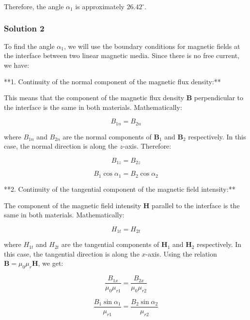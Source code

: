 \documentclass{article}
\begin{document}
Therefore, the angle $\alpha_1$ is approximately $26.42^\circ$.

\subsubsection{Solution 2}
To find the angle $\alpha_1$, we will use the boundary conditions for magnetic fields at the interface between two linear magnetic media. Since there is no free current, we have:

**1. Continuity of the normal component of the magnetic flux density:**

This means that the component of the magnetic flux density $\mathbf{B}$ perpendicular to the interface is the same in both materials. Mathematically:

\begin{equation*}
B_{1n} = B_{2n}
\end{equation*}

where $B_{1n}$ and $B_{2n}$ are the normal components of $\mathbf{B}_1$ and $\mathbf{B}_2$ respectively. In this case, the normal direction is along the $z$-axis. Therefore:

\begin{equation*}
B_{1z} = B_{2z}
\end{equation*}

\begin{equation*}
B_1 \cos \alpha_1 = B_2 \cos \alpha_2
\end{equation*}

**2. Continuity of the tangential component of the magnetic field intensity:**

The component of the magnetic field intensity $\mathbf{H}$ parallel to the interface is the same in both materials. Mathematically:

\begin{equation*}
H_{1t} = H_{2t}
\end{equation*}

where $H_{1t}$ and $H_{2t}$ are the tangential components of $\mathbf{H}_1$ and $\mathbf{H}_2$ respectively. In this case, the tangential direction is along the $x$-axis.  Using the relation $\mathbf{B} = \mu_0 \mu_r \mathbf{H}$, we get:

\begin{equation*}
\frac{B_{1x}}{\mu_0 \mu_{r1}} = \frac{B_{2x}}{\mu_0 \mu_{r2}}
\end{equation*}

\begin{equation*}
\frac{B_1 \sin \alpha_1}{\mu_{r1}} = \frac{B_2 \sin \alpha_2}{\mu_{r2}}
\end{equation*}
\end{document}
